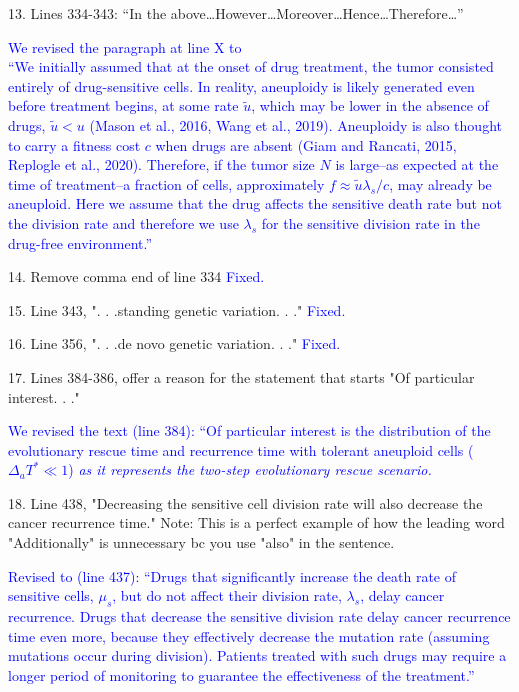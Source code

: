 \documentclass[12pt]{extarticle}
\begin{document}
13. Lines 334-343: ``In the above\ldots However\ldots Moreover\ldots Hence\dots Therefore\ldots ''

\textcolor{blue}{We revised the paragraph at line X to \\
``We initially assumed that at the onset of drug treatment, the tumor consisted entirely of drug-sensitive cells. In reality, aneuploidy is likely generated even before treatment begins, at some rate $\tilde{u}$, which may be lower in the absence of drugs, $\tilde{u} < u$ (Mason et al., 2016, Wang et al., 2019). 
Aneuploidy is also thought to carry a fitness cost $c$ when drugs are absent (Giam and Rancati, 2015, Replogle et al., 2020). 
Therefore, if the tumor size $N$ is large--as expected at the time of treatment--a fraction of cells, approximately $f \approx \tilde{u}\lambda_s/c$, may already be aneuploid.
Here we assume that the drug affects the sensitive death rate but not the division rate and therefore we use $\lambda_s$ for the sensitive division rate in the drug-free environment.''}

14. Remove comma end of line 334
\textcolor{blue}{Fixed. }%

15. Line 343, ". . .standing genetic variation. . ."
\textcolor{blue}{Fixed. }%

16. Line 356, ". . .de novo genetic variation. . ."
\textcolor{blue}{Fixed.}

17. Lines 384-386, offer a reason for the statement that starts "Of particular interest. . ."

\textcolor{blue}{We revised the text (line 384): ``Of particular interest is the distribution of the evolutionary rescue time and recurrence time with tolerant aneuploid cells ($\Delta_a T^*\ll1$) \emph{as it represents the two-step evolutionary rescue scenario.}}

18. Line 438, "Decreasing the sensitive cell division rate will also decrease the cancer recurrence time." Note: This is a perfect example of how the leading word "Additionally" is unnecessary bc you use "also" in the sentence.

\textcolor{blue}{Revised to (line 437): ``Drugs that significantly increase the death rate of sensitive cells, $\mu_s$, but do not affect their division rate, $\lambda_s$, delay cancer recurrence. Drugs that decrease the sensitive division rate delay cancer recurrence time even more, because they effectively decrease the mutation rate (assuming mutations occur during division).  Patients treated with such drugs may require a longer period of monitoring to guarantee the effectiveness of the treatment.''}
\end{document}
